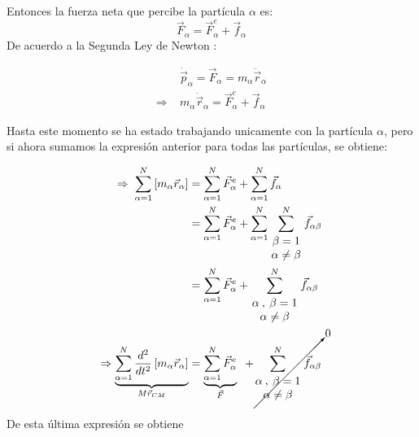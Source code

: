 \documentclass[/home/hernan-barquero/Documents/Apuntes_mecanica_teorica/main.tex]{subfiles}
\begin{document}
		Entonces la fuerza neta que percibe la partícula $\alpha$ es:
		\begin{equation*}
			\vec{F}_{\alpha} = \vec{F}_{\alpha}^{e} + \vec{f}_{\alpha}
		\end{equation*}
		De acuerdo a la Segunda Ley de Newton :

		\begin{align*}
			& \dot{\vec{p}}_{\alpha} = \vec{F}_{\alpha} = m_{\alpha}\ddot{\vec{r}}_{\alpha} \\ 
			\Rightarrow \; & m_{\alpha}\ddot{\vec{r}}_{\alpha} = \vec{F}_{\alpha}^{e} + \vec{f}_{\alpha}
		\end{align*}

		Hasta este momento se ha estado trabajando unicamente con la partícula $\alpha$, pero si ahora sumamos la expresión anterior para todas las partículas, se obtiene:

		\begin{align*}
			\Rightarrow \; \sum_{\alpha  = 1}^{N} \left[m_{\alpha} \vec{r}_{\alpha}\right] & = \sum_{\alpha = 1}^{N} \vec{F}_{\alpha}^{e} + \sum_{\alpha = 1}^{N} \vec{f}_{\alpha} \\ 
			& = \sum_{\alpha = 1}^{N} \vec{F}_{\alpha}^{e} + \sum_{\alpha = 1}^{N} \sum_{\left .\begin{matrix} \beta = 1\\ \alpha \neq \beta \end{matrix}\right .}^{N}\vec{f}_{\alpha \beta} \\ 
			& =  \sum_{\alpha = 1}^{N} \vec{F}_{\alpha}^{e} + \sum_{\left .\begin{matrix} \alpha \: , \: \beta = 1\\ \alpha \neq \beta \end{matrix}\right .}^{N}\vec{f}_{\alpha \beta} \\ 
			\Rightarrow \underbrace{\sum_{\alpha  = 1}^{N} \frac{d^{2}}{dt^{2}} \left[m_{\alpha} \vec{r}_{\alpha}\right]}_{M \vec{r}_{CM}} & = \underbrace{ \sum_{\alpha = 1}^{N} \vec{F}_{\alpha}^{e}}_{\vec{F}} \; \; + \cancelto{0}{\sum_{\left . \begin{matrix} \alpha \: , \: \beta = 1\\ \alpha \neq \beta \end{matrix} \right .}^{N}\vec{f}_{\alpha \beta}}
		\end{align*} 

		De esta última expresión se obtiene 
\end{document}
